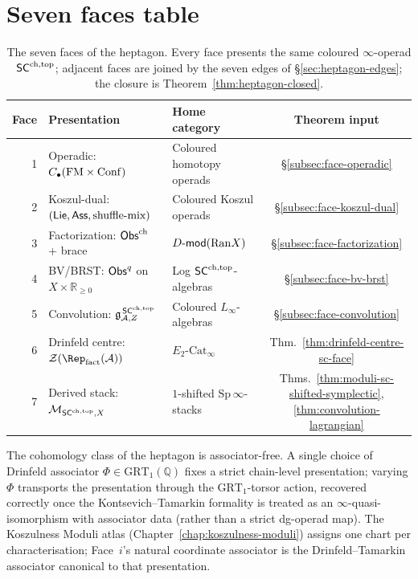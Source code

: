\section{Seven faces table}
\label{sec:heptagon-summary}

\begin{table}[h]
\centering
\begin{tabular}{rllc}
\toprule
Face & Presentation & Home category & Theorem input \\
\midrule
1 & Operadic: $C_\bullet(\mathrm{FM}\times\mathrm{Conf})$ & Coloured homotopy operads
& \S\ref{subsec:face-operadic} \\
2 & Koszul-dual: $(\mathsf{Lie},\mathsf{Ass},\text{shuffle-mix})$ & Coloured Koszul
operads & \S\ref{subsec:face-koszul-dual} \\
3 & Factorization: $\mathsf{Obs}^{\mathrm{ch}}$ + brace & $D\text{-}\mathsf{mod}(\mathrm{Ran} X)$ &
\S\ref{subsec:face-factorization} \\
4 & BV/BRST: $\mathsf{Obs}^q$ on $X\times\mathbb{R}_{\geq 0}$ &
Log $\mathsf{SC}^{\mathrm{ch},\mathrm{top}}$-algebras & \S\ref{subsec:face-bv-brst} \\
5 & Convolution: $\mathfrak{g}^{\,\mathsf{SC}^{\mathrm{ch},\mathrm{top}}}_{\mathcal{A},Z}$ & Coloured
$L_\infty$-algebras & \S\ref{subsec:face-convolution} \\
6 & Drinfeld centre: $\cZ(\Rep_{\mathrm{fact}}(\cA))$ &
$E_2$-$\mathrm{Cat}_\infty$ &
Thm.~\ref{thm:drinfeld-centre-sc-face} \\
7 & Derived stack: $\mathcal{M}_{\mathsf{SC}^{\mathrm{ch},\mathrm{top}},X}$ & $1$-shifted
$\mathrm{Sp}\,\infty$-stacks &
Thms.~\ref{thm:moduli-sc-shifted-symplectic},
\ref{thm:convolution-lagrangian} \\
\bottomrule
\end{tabular}
\caption{The seven faces of the heptagon. Every face presents the
same coloured $\infty$-operad $\mathsf{SC}^{\mathrm{ch},\mathrm{top}}$; adjacent faces are joined
by the seven edges of \S\ref{sec:heptagon-edges}; the closure is
Theorem~\ref{thm:heptagon-closed}.}
\label{tab:heptagon-faces}
\end{table}

\begin{remark}\label{rem:heptagon-assoc-free}
The cohomology class of the heptagon is associator-free. A single
choice of Drinfeld associator $\Phi\in\mathrm{GRT}_1(\mathbb{Q})$
fixes a strict chain-level presentation; varying $\Phi$ transports
the presentation through the $\mathrm{GRT}_1$-torsor action,
recovered correctly once the Kontsevich--Tamarkin
formality is treated as an $\infty$-quasi-isomorphism with
associator data (rather than a strict dg-operad map). The
Koszulness Moduli atlas
(Chapter~\ref{chap:koszulness-moduli}) assigns one chart per
characterisation; Face~$i$'s natural coordinate associator is the
Drinfeld--Tamarkin associator canonical to that presentation.
\end{remark}

